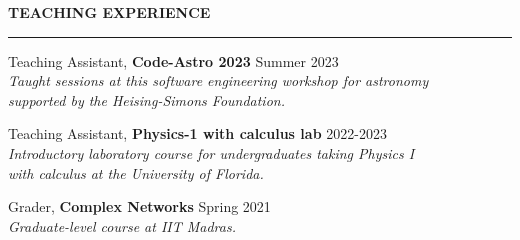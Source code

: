 \documentclass{resume} %
\renewenvironment{rSection}[1]{
\sectionskip
\textbf{\textcolor{C2}{\MakeUppercase{#1}}}
\sectionlineskip
\hrule
\begin{list}{}{
\setlength{\leftmargin}{1.5em}
}
\item[]
}{
\end{list}
}
\begin{document}
\begin{rSection}{Teaching
Experience}

Teaching Assistant, \textbf{Code-Astro 2023} \hfill Summer 2023 \\
\emph{Taught sessions at this software engineering workshop for astronomy \\ supported by
the Heising-Simons Foundation.}

Teaching Assistant, \textbf{Physics-1 with calculus lab} \hfill 2022-2023 \\
\emph{Introductory laboratory course for undergraduates taking Physics I \\
with calculus at the University of Florida.}

Grader, \textbf{Complex Networks} \hfill Spring 2021 \\
\emph{Graduate-level course at IIT Madras.}


\end{rSection}
\end{document}
